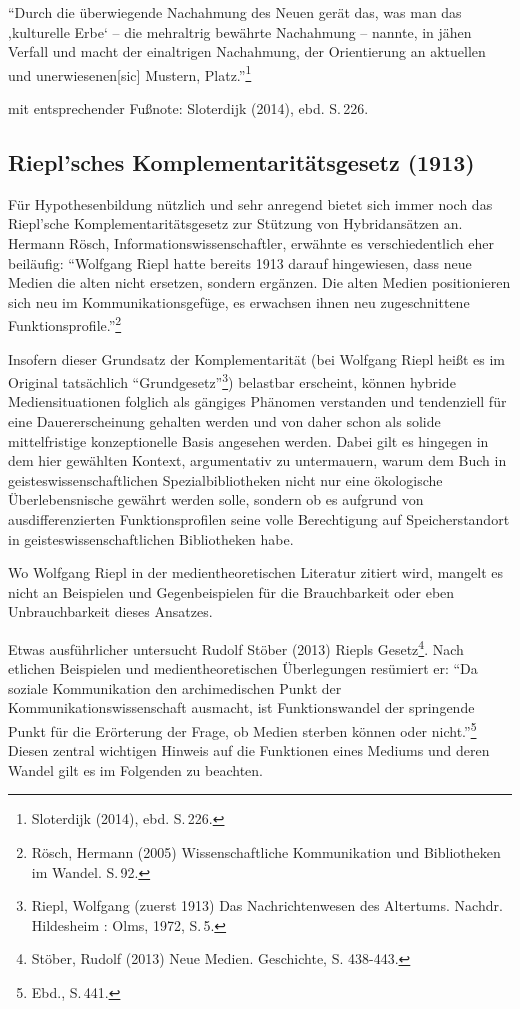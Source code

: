 \documentclass[a4paper,
fontsize=11pt,
oneside,
numbers=noperiodatend,
parskip=half-,
bibliography=totoc,
final
]{scrartcl}
\begin{document}
\enquote{Durch die überwiegende Nachahmung des Neuen gerät das, was man
das ‚kulturelle Erbe` -- die mehraltrig bewährte Nachahmung -- nannte,
in jähen Verfall und macht der einaltrigen Nachahmung, der Orientierung
an aktuellen und unerwiesenen{[}sic{]} Mustern, Platz.}\footnote{Sloterdijk
  (2014), ebd. S.\,226.}

mit entsprechender Fußnote: Sloterdijk (2014), ebd. S.\,226.

\subsection*{Riepl'sches Komplementaritätsgesetz
(1913)}\label{rieplsches-komplementarituxe4tsgesetz-1913}

Für Hypothesenbildung nützlich und sehr anregend bietet sich immer noch
das Riepl'sche Komplementaritätsgesetz zur Stützung von Hybridansätzen
an. Hermann Rösch, Informationswissenschaftler, erwähnte es
verschiedentlich eher beiläufig: \enquote{Wolfgang Riepl hatte bereits
1913 darauf hingewiesen, dass neue Medien die alten nicht ersetzen,
sondern ergänzen. Die alten Medien positionieren sich neu im
Kommunikationsgefüge, es erwachsen ihnen neu zugeschnittene
Funktionsprofile.}\footnote{Rösch, Hermann (2005) Wissenschaftliche
  Kommunikation und Bibliotheken im Wandel. S.\,92.}

Insofern dieser Grundsatz der Komplementarität (bei Wolfgang Riepl heißt
es im Original tatsächlich \enquote{Grundgesetz}\footnote{Riepl,
  Wolfgang (zuerst 1913) Das Nachrichtenwesen des Altertums. Nachdr.
  Hildesheim : Olms, 1972, S.\,5.}) belastbar erscheint, können hybride
Mediensituationen folglich als gängiges Phänomen verstanden und
tendenziell für eine Dauererscheinung gehalten werden und von daher
schon als solide mittelfristige konzeptionelle Basis angesehen werden.
Dabei gilt es hingegen in dem hier gewählten Kontext, argumentativ zu
untermauern, warum dem Buch in geisteswissenschaftlichen
Spezialbibliotheken nicht nur eine ökologische Überlebensnische gewährt
werden solle, sondern ob es aufgrund von ausdifferenzierten
Funktionsprofilen seine volle Berechtigung auf Speicherstandort in
geisteswissenschaftlichen Bibliotheken habe.

Wo Wolfgang Riepl in der medientheoretischen Literatur zitiert wird,
mangelt es nicht an Beispielen und Gegenbeispielen für die Brauchbarkeit
oder eben Unbrauchbarkeit dieses Ansatzes.

Etwas ausführlicher untersucht Rudolf Stöber (2013) Riepls
Gesetz\footnote{Stöber, Rudolf (2013) Neue Medien. Geschichte, S.
  438-443.}. Nach etlichen Beispielen und medientheoretischen
Überlegungen resümiert er: \enquote{Da soziale Kommunikation den
archimedischen Punkt der Kommunikationswissenschaft ausmacht, ist
Funktionswandel der springende Punkt für die Erörterung der Frage, ob
Medien sterben können oder nicht.}\footnote{Ebd., S.\,441.} Diesen
zentral wichtigen Hinweis auf die Funktionen eines Mediums und deren
Wandel gilt es im Folgenden zu beachten.
\end{document}
